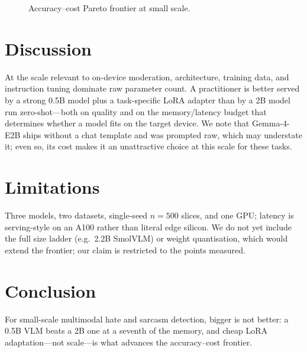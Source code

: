 \documentclass[sigconf,nonacm]{acmart}
\begin{document}
\begin{figure}[t]
\centering
{}
\caption{Accuracy--cost Pareto frontier at small scale.}
\label{fig:pareto}
\end{figure}

\section{Discussion}
At the scale relevant to on-device moderation, architecture, training data, and
instruction tuning dominate raw parameter count. A practitioner is better served by a
strong 0.5B model plus a task-specific LoRA adapter than by a 2B model run zero-shot---both
on quality and on the memory/latency budget that determines whether a model fits on the
target device. We note that Gemma-4-E2B ships without a chat template and was prompted
raw, which may understate it; even so, its cost makes it an unattractive choice at this
scale for these tasks.

\section{Limitations}
Three models, two datasets, single-seed $n{=}500$ slices, and one GPU; latency is
serving-style on an A100 rather than literal edge silicon. We do not yet include the full
size ladder (e.g.\ 2.2B SmolVLM) or weight quantisation, which would extend the frontier;
our claim is restricted to the points measured.

\section{Conclusion}
For small-scale multimodal hate and sarcasm detection, bigger is not better: a 0.5B VLM
beats a 2B one at a seventh of the memory, and cheap LoRA adaptation---not scale---is what
advances the accuracy--cost frontier.



\end{document}
